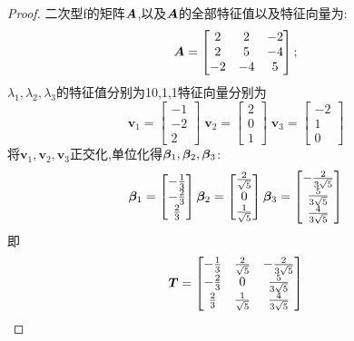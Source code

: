 \documentclass[lang=cn,11pt,normal]{elegantbook}
\begin{document}
	\begin{proof}
		二次型f的矩阵$\AA$,以及$\AA$的全部特征值以及特征向量为:
		\begin{equation}
		\AA=
		\begin{bmatrix}
		2&2&-2\\
		2&5&-4\\
		-2&-4&5
		\end{bmatrix};
		\end{equation}
		$\lambda_1,\lambda_2,\lambda_3$的特征值分别为10,1,1特征向量分别为
		\begin{equation}
		\boldsymbol{v}_1=\begin{bmatrix}-1\\-2\\2\end{bmatrix}\;\boldsymbol{v}_2=\begin{bmatrix}2\\0\\1\end{bmatrix}\;\boldsymbol{v}_3=\begin{bmatrix}-2\\1\\0\end{bmatrix}
		\end{equation}
		将$\boldsymbol{v}_1,\boldsymbol{v}_2,\boldsymbol{v}_3$正交化,单位化得$\bfbt_1,\bfbt_2,\bfbt_3$:
		\begin{equation}
		\bfbt_1=
		\begin{bmatrix}
		-\frac{1}{3}\\-\frac{2}{3}\\\frac{2}{3}
		\end{bmatrix}
		\bfbt_2=
		\begin{bmatrix}
		\frac{2}{\sqrt{5}}\\0\\\frac{1}{\sqrt{5}}
		\end{bmatrix}
		\bfbt_3=
		\begin{bmatrix}
		-\frac{2}{3\sqrt{5}}\\\frac{5}{3\sqrt{5}}\\\frac{4}{3\sqrt{5}}
		\end{bmatrix}
		\end{equation}
		即
		\begin{equation}
		\TT=
		\begin{bmatrix}
		-\frac{1}{3}&\frac{2}{\sqrt{5}}&-\frac{2}{3\sqrt{5}}\\
		-\frac{2}{3}&0&\frac{5}{3\sqrt{5}}\\
		\frac{2}{3}&\frac{1}{\sqrt{5}}&\frac{4}{3\sqrt{5}}

\end{bmatrix}
\end{equation}
\end{proof}
\end{document}
